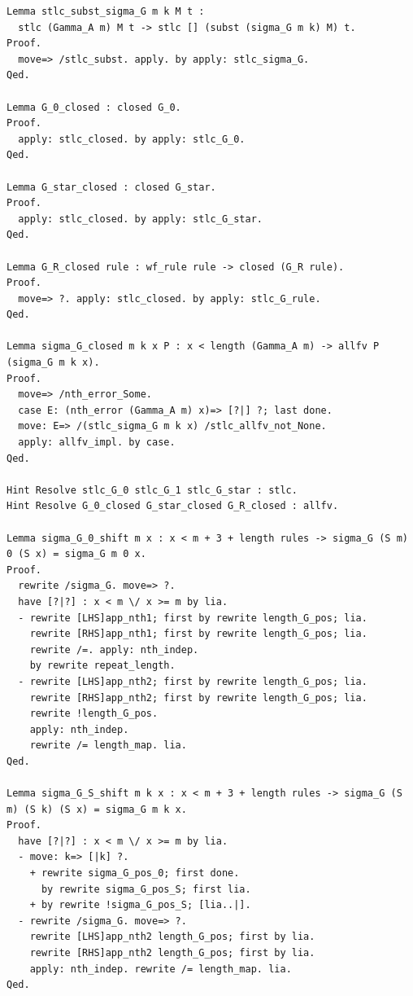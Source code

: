 \begin{lstlisting}
Lemma stlc_subst_sigma_G m k M t : 
  stlc (Gamma_A m) M t -> stlc [] (subst (sigma_G m k) M) t.
Proof.
  move=> /stlc_subst. apply. by apply: stlc_sigma_G.
Qed.

Lemma G_0_closed : closed G_0.
Proof.
  apply: stlc_closed. by apply: stlc_G_0.
Qed.

Lemma G_star_closed : closed G_star.
Proof.
  apply: stlc_closed. by apply: stlc_G_star.
Qed.

Lemma G_R_closed rule : wf_rule rule -> closed (G_R rule).
Proof.
  move=> ?. apply: stlc_closed. by apply: stlc_G_rule.
Qed.

Lemma sigma_G_closed m k x P : x < length (Gamma_A m) -> allfv P (sigma_G m k x).
Proof.
  move=> /nth_error_Some.
  case E: (nth_error (Gamma_A m) x)=> [?|] ?; last done.
  move: E=> /(stlc_sigma_G m k x) /stlc_allfv_not_None.
  apply: allfv_impl. by case.
Qed.

Hint Resolve stlc_G_0 stlc_G_1 stlc_G_star : stlc.
Hint Resolve G_0_closed G_star_closed G_R_closed : allfv.

Lemma sigma_G_0_shift m x : x < m + 3 + length rules -> sigma_G (S m) 0 (S x) = sigma_G m 0 x.
Proof.
  rewrite /sigma_G. move=> ?.
  have [?|?] : x < m \/ x >= m by lia.
  - rewrite [LHS]app_nth1; first by rewrite length_G_pos; lia.
    rewrite [RHS]app_nth1; first by rewrite length_G_pos; lia.
    rewrite /=. apply: nth_indep.
    by rewrite repeat_length.
  - rewrite [LHS]app_nth2; first by rewrite length_G_pos; lia.
    rewrite [RHS]app_nth2; first by rewrite length_G_pos; lia.
    rewrite !length_G_pos.
    apply: nth_indep.
    rewrite /= length_map. lia.
Qed.

Lemma sigma_G_S_shift m k x : x < m + 3 + length rules -> sigma_G (S m) (S k) (S x) = sigma_G m k x.
Proof.
  have [?|?] : x < m \/ x >= m by lia.
  - move: k=> [|k] ?.
    + rewrite sigma_G_pos_0; first done.
      by rewrite sigma_G_pos_S; first lia.
    + by rewrite !sigma_G_pos_S; [lia..|].
  - rewrite /sigma_G. move=> ?.
    rewrite [LHS]app_nth2 length_G_pos; first by lia.
    rewrite [RHS]app_nth2 length_G_pos; first by lia.
    apply: nth_indep. rewrite /= length_map. lia.
Qed.


\end{lstlisting}
